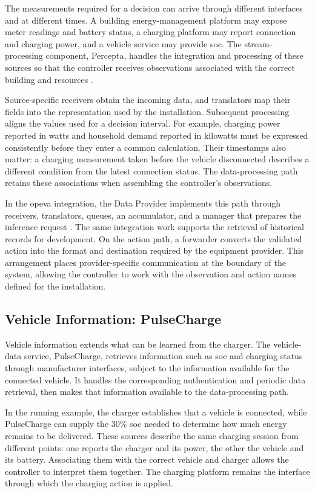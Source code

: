The measurements required for a decision can arrive through different interfaces and at different times. A building energy-management platform may expose meter readings and battery status, a charging platform may report connection and charging power, and a vehicle service may provide \gls{soc}. The stream-processing component, Percepta, handles the integration and processing of these sources so that the controller receives observations associated with the correct building and resources \parencite{percepta2025}.

Source-specific receivers obtain the incoming data, and translators map their fields into the representation used by the installation. Subsequent processing aligns the values used for a decision interval. For example, charging power reported in watts and household demand reported in kilowatts must be expressed consistently before they enter a common calculation. Their timestamps also matter: a charging measurement taken before the vehicle disconnected describes a different condition from the latest connection status. The data-processing path retains these associations when assembling the controller's observations.

In the \gls{opeva} integration, the Data Provider implements this path through receivers, translators, queues, an accumulator, and a manager that prepares the inference request \parencite{opeva2026d63}. The same integration work supports the retrieval of historical records for development. On the action path, a forwarder converts the validated action into the format and destination required by the equipment provider. This arrangement places provider-specific communication at the boundary of the system, allowing the controller to work with the observation and action names defined for the installation.

\subsection{Vehicle Information: PulseCharge}
\label{sec:energaize-pulsecharge}

Vehicle information extends what can be learned from the charger. The vehicle-data service, PulseCharge, retrieves information such as \gls{soc} and charging status through manufacturer interfaces, subject to the information available for the connected vehicle. It handles the corresponding authentication and periodic data retrieval, then makes that information available to the data-processing path.

In the running example, the charger establishes that a vehicle is connected, while PulseCharge can supply the 30\% \gls{soc} needed to determine how much energy remains to be delivered. These sources describe the same charging session from different points: one reports the charger and its power, the other the vehicle and its battery. Associating them with the correct vehicle and charger allows the controller to interpret them together. The charging platform remains the interface through which the charging action is applied.

